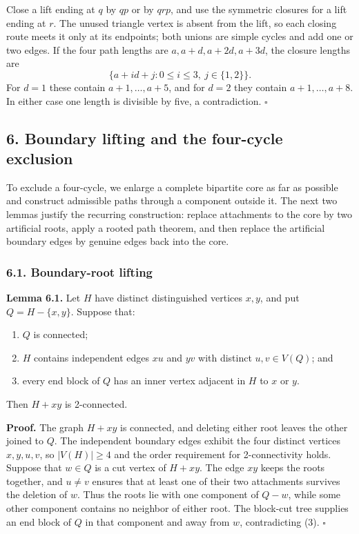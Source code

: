 \documentclass[
  11pt]{article}
\providecommand{\tightlist}{%
  \setlength{\itemsep}{0pt}\setlength{\parskip}{0pt}}
\let\papersection\subsection
\renewcommand{\subsection}{\Needspace{10\baselineskip}\papersection}
\let\papersubsection\subsubsection
\renewcommand{\subsubsection}{\Needspace{7\baselineskip}\papersubsection}
\begin{document}
Close a lift ending at \(q\) by \(qp\) or by \(qrp\), and use the
symmetric closures for a lift ending at \(r\). The unused triangle
vertex is absent from the lift, so each closing route meets it only at
its endpoints; both unions are simple cycles and add one or two edges.
If the four path lengths are \(a,a+d,a+2d,a+3d\), the closure lengths
are \[
 \{a+id+j:0\le i\le3,\ j\in\{1,2\}\}.
\] For \(d=1\) these contain \(a+1,\ldots,a+5\), and for \(d=2\) they
contain \(a+1,\ldots,a+8\). In either case one length is divisible by
five, a contradiction. \(\square\)

\subsection{6. Boundary lifting and the four-cycle
exclusion}\label{boundary-lifting-and-the-four-cycle-exclusion}

To exclude a four-cycle, we enlarge a complete bipartite core as far as
possible and construct admissible paths through a component outside it.
The next two lemmas justify the recurring construction: replace
attachments to the core by two artificial roots, apply a rooted path
theorem, and then replace the artificial boundary edges by genuine edges
back into the core.

\subsubsection{6.1. Boundary-root lifting}\label{boundary-root-lifting}

\textbf{Lemma 6.1.} Let \(H\) have distinct distinguished vertices
\(x,y\), and put \(Q=H-\{x,y\}\). Suppose that:

\begin{enumerate}
\def\labelenumi{\arabic{enumi}.}
\tightlist
\item
  \(Q\) is connected;
\item
  \(H\) contains independent edges \(xu\) and \(yv\) with distinct
  \(u,v\in V(Q)\); and
\item
  every end block of \(Q\) has an inner vertex adjacent in \(H\) to
  \(x\) or \(y\).
\end{enumerate}

Then \(H+xy\) is 2-connected.

\textbf{Proof.} The graph \(H+xy\) is connected, and deleting either
root leaves the other joined to \(Q\). The independent boundary edges
exhibit the four distinct vertices \(x,y,u,v\), so \(|V(H)|\ge4\) and
the order requirement for 2-connectivity holds. Suppose that \(w\in Q\)
is a cut vertex of \(H+xy\). The edge \(xy\) keeps the roots together,
and \(u\ne v\) ensures that at least one of their two attachments
survives the deletion of \(w\). Thus the roots lie with one component of
\(Q-w\), while some other component contains no neighbor of either root.
The block-cut tree supplies an end block of \(Q\) in that component and
away from \(w\), contradicting (3). \(\square\)
\end{document}
